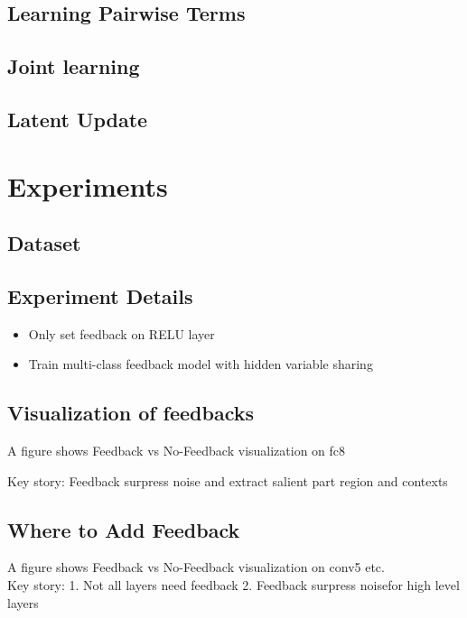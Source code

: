\documentclass[10pt,twocolumn,letterpaper]{article}
\begin{document}
\subsection{Learning Pairwise Terms}

\subsection{Joint learning}

\subsection{Latent Update}

\section{Experiments}

\subsection{Dataset}

\subsection{Experiment Details}
\begin{itemize}
  \item Only set feedback on RELU layer 
  \item Train multi-class feedback model with hidden variable sharing
\end{itemize}

\subsection{Visualization of feedbacks}
A figure shows Feedback vs No-Feedback visualization on fc8

Key story: Feedback surpress noise and extract salient part region and contexts

\subsection{Where to Add Feedback}
A figure shows Feedback vs No-Feedback visualization on conv5 etc. \\

Key story: 1. Not all layers need feedback 2. Feedback surpress noisefor high level layers
\end{document}
